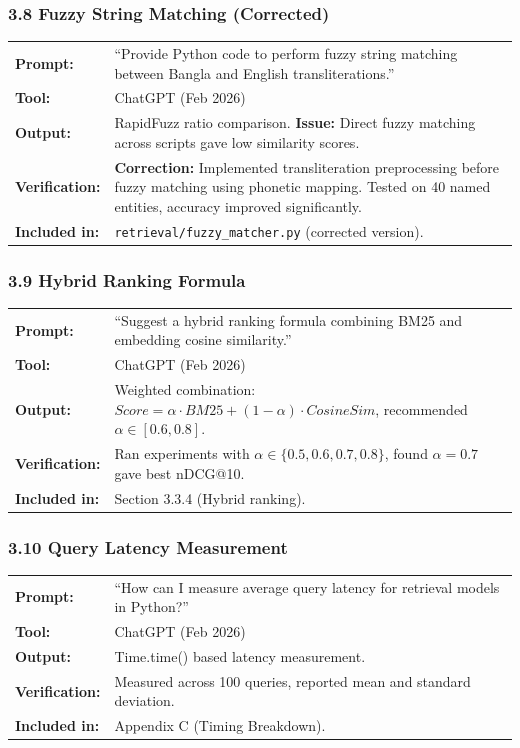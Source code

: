 \documentclass[12pt,a4paper]{article}
\begin{document}
\subsubsection*{3.8 Fuzzy String Matching (Corrected)}
\begin{tabular}{p{3.2cm}p{9.5cm}}
\textbf{Prompt:}        & ``Provide Python code to perform fuzzy string matching between Bangla and English transliterations.'' \\
\textbf{Tool:}          & ChatGPT (Feb 2026) \\
\textbf{Output:}        & RapidFuzz ratio comparison. \textbf{Issue:} Direct fuzzy matching across scripts gave low similarity scores. \\
\textbf{Verification:}  & \textbf{Correction:} Implemented transliteration preprocessing before fuzzy matching using phonetic mapping. Tested on 40 named entities, accuracy improved significantly. \\
\textbf{Included in:}   & \texttt{retrieval/fuzzy\_matcher.py} (corrected version). \\
\end{tabular}

\subsubsection*{3.9 Hybrid Ranking Formula}
\begin{tabular}{p{3.2cm}p{9.5cm}}
\textbf{Prompt:}        & ``Suggest a hybrid ranking formula combining BM25 and embedding cosine similarity.'' \\
\textbf{Tool:}          & ChatGPT (Feb 2026) \\
\textbf{Output:}        & Weighted combination: $Score = \alpha \cdot BM25 + (1-\alpha) \cdot CosineSim$, recommended $\alpha \in [0.6, 0.8]$. \\
\textbf{Verification:}  & Ran experiments with $\alpha \in \{0.5, 0.6, 0.7, 0.8\}$, found $\alpha = 0.7$ gave best nDCG@10. \\
\textbf{Included in:}   & Section 3.3.4 (Hybrid ranking). \\
\end{tabular}

\subsubsection*{3.10 Query Latency Measurement}
\begin{tabular}{p{3.2cm}p{9.5cm}}
\textbf{Prompt:}        & ``How can I measure average query latency for retrieval models in Python?'' \\
\textbf{Tool:}          & ChatGPT (Feb 2026) \\
\textbf{Output:}        & Time.time() based latency measurement. \\
\textbf{Verification:}  & Measured across 100 queries, reported mean and standard deviation. \\
\textbf{Included in:}   & Appendix C (Timing Breakdown). \\
\end{tabular}
\end{document}
